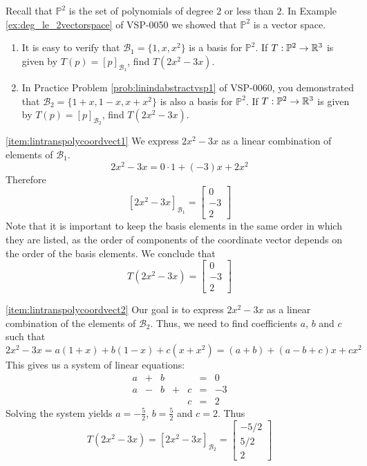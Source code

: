 \documentclass{ximera}
\begin{document}
\begin{example}\label{ex:abstvectsplintranspoly}
Recall that $\mathbb{P}^2$ is the set of polynomials of degree $2$ or less than $2$.  In Example \ref{ex:deg_le_2vectorspace} of VSP-0050 we showed that $\mathbb{P}^2$ is a vector space. 
\begin{enumerate}
    \item \label{item:lintranspolycoordvect1} It is easy to verify that $\mathcal{B}_1=\{1, x, x^{2}\}$ is a basis for $\mathbb{P}^2$.  If $T:\mathbb{P}^2\rightarrow \mathbb{R}^3$ is given by $T(p)=[p]_{\mathcal{B}_1}$, find $T(2x^2-3x)$.
    \item \label{item:lintranspolycoordvect2}
In Practice Problem \ref{prob:linindabstractvsp1} of VSP-0060, you demonstrated that $\mathcal{B}_2=\{1 + x, 1 - x, x + x^{2}\}$ is also a basis for $\mathbb{P}^2$.  If $T:\mathbb{P}^2\rightarrow \mathbb{R}^3$ is given by $T(p)=[p]_{\mathcal{B}_2}$, find $T(2x^2-3x)$.
\end{enumerate}
\begin{explanation}
\ref{item:lintranspolycoordvect1}  We express $2x^2-3x$ as a linear combination of elements of $\mathcal{B}_1$.
$$2x^2-3x=0\cdot 1+ (-3)x+2x^2$$
Therefore $$[2x^2-3x]_{\mathcal{B}_1}=\begin{bmatrix}0\\-3\\2\end{bmatrix}$$
Note that it is important to keep the basis elements in the same order in which they are listed, as the order of components of the coordinate vector depends on the order of the basis elements.  We conclude that
$$T(2x^2-3x)=\begin{bmatrix}0\\-3\\2\end{bmatrix}$$

\ref{item:lintranspolycoordvect2} Our goal is to express $2x^2-3x$ as a linear combination of the elements of $\mathcal{B}_2$.  Thus, we need to find coefficients $a$, $b$ and $c$ such that
$$2x^2-3x=a(1+x)+b(1-x)+c(x+x^2)=(a+b)+(a-b+c)x+cx^2$$
This gives us a system of linear equations:
$$\begin{array}{ccccccc}
      a & +&b&&&= &0 \\
	 a& -&b&+&c&=&-3\\
     & &&&c&=&2
    \end{array}$$
    Solving the system yields $a=-\frac{5}{2}$, $b=\frac{5}{2}$ and $c=2$.  Thus
    $$T(2x^2-3x)=[2x^2-3x]_{\mathcal{B}_2}=\begin{bmatrix}-5/2\\5/2\\2\end{bmatrix}$$
\end{explanation}
\end{example}
\end{document}
